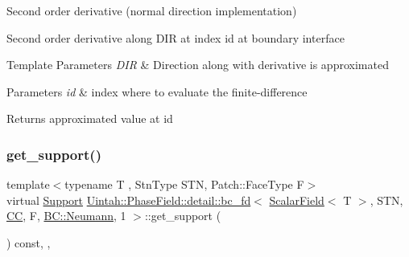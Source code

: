Second order derivative (normal direction implementation) 

Second order derivative along D\+IR at index id at boundary interface


\begin{DoxyTemplParams}{Template Parameters}
{\em D\+IR} & Direction along with derivative is approximated \\
\hline
\end{DoxyTemplParams}

\begin{DoxyParams}{Parameters}
{\em id} & index where to evaluate the finite-\/difference \\
\hline
\end{DoxyParams}
\begin{DoxyReturn}{Returns}
approximated value at id 
\end{DoxyReturn}
\mbox{\label{classUintah_1_1PhaseField_1_1detail_1_1bc__fd_3_01ScalarField_3_01T_01_4_00_01STN_00_01CC_00_01F_00_01BC_1_1Neumann_00_011_01_4_a90a5e22d8aeb5d4d8b11663e5f4c6028}} 
\subsubsection{\texorpdfstring{get\+\_\+support()}{get\_support()}}
{\footnotesize\ttfamily template$<$typename T , Stn\+Type S\+TN, Patch\+::\+Face\+Type F$>$ \\
virtual \hyperlink{classUintah_1_1PhaseField_1_1Support}{Support} \hyperlink{classUintah_1_1PhaseField_1_1detail_1_1bc__fd}{Uintah\+::\+Phase\+Field\+::detail\+::bc\+\_\+fd}$<$ \hyperlink{structUintah_1_1PhaseField_1_1ScalarField}{Scalar\+Field}$<$ T $>$, S\+TN, \hyperlink{namespaceUintah_1_1PhaseField_a33d355affda78a83f45755ba8388cedda22303704507d024d1d6508ed9859a85a}{CC}, F, \hyperlink{namespaceUintah_1_1PhaseField_a148fba372aa3be96fd6eede7a2fa10b5ab8537a769dbc90cb1762215441212152}{B\+C\+::\+Neumann}, 1 $>$\+::get\+\_\+support (\begin{DoxyParamCaption}{ }\end{DoxyParamCaption}) const\hspace{0.3cm}{\ttfamily [inline]}, {\ttfamily [override]}, {\ttfamily [virtual]}}



